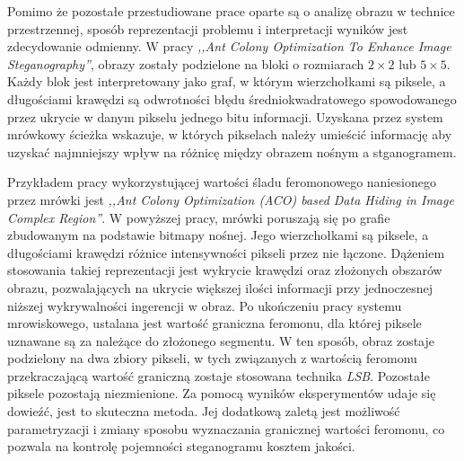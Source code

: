 {{{            %
            Pomimo że pozostałe przestudiowane prace oparte są o analizę obrazu w technice przestrzennej, sposób
            reprezentacji problemu i interpretacji wyników jest zdecydowanie odmienny. W pracy \textit{,,Ant Colony
            Optimization To Enhance Image Steganography''}\cite{ZghaerACOStegEN}, obrazy zostały podzielone na bloki o
            rozmiarach $2 \times 2$ lub $5 \times 5$. Każdy blok jest interpretowany jako graf, w którym wierzchołkami
            są piksele, a długościami krawędzi są odwrotności błędu średniokwadratowego spowodowanego przez ukrycie w
            danym pikselu jednego bitu informacji. Uzyskana przez system mrówkowy ścieżka wskazuje, w których pikselach
            należy umieścić informację aby uzyskać najmniejszy wpływ na różnicę między obrazem nośnym a
            stganogramem\cite{ZghaerACOStegEN}.

            Przykładem pracy wykorzystującej wartości śladu feromonowego naniesionego przez mrówki jest \textit{,,Ant
            Colony Optimization (ACO) based Data Hiding in Image Complex Region''}\cite{Khan2018AntCO}. W powyższej
            pracy, mrówki poruszają się po grafie zbudowanym na podstawie bitmapy nośnej. Jego wierzchołkami są piksele,
            a długościami krawędzi różnice intensywności pikseli przez nie łączone. Dążeniem stosowania takiej
            reprezentacji jest wykrycie krawędzi oraz złożonych obszarów obrazu, pozwalających na ukrycie większej
            ilości informacji przy jednoczesnej niższej wykrywalności ingerencji w obraz. Po ukończeniu pracy systemu
            mrowiskowego, ustalana jest wartość graniczna feromonu, dla której piksele uznawane są za należące do
            złożonego segmentu. W ten sposób, obraz zostaje podzielony na dwa zbiory pikseli, w tych związanych z
            wartością feromonu przekraczającą wartość graniczną zostaje stosowana technika \textit{LSB}. Pozostałe
            piksele pozostają niezmienione. Za pomocą wyników eksperymentów udaje się dowieźć, jest to skuteczna metoda.
            Jej dodatkową zaletą jest możliwość parametryzacji i zmiany sposobu wyznaczania granicznej wartości
            feromonu, co pozwala na kontrolę pojemności steganogramu kosztem jakości\cite{Khan2018AntCO}.
        }
    }

}
